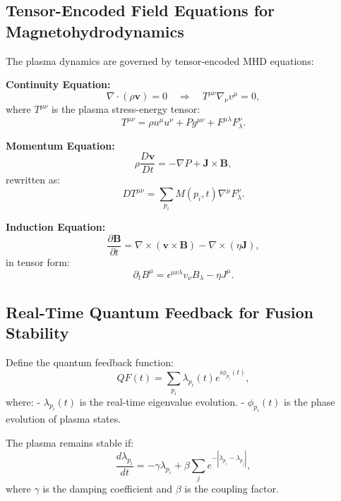 \documentclass{article}
\theoremstyle{plain}
\begin{document}
\subsection{Tensor-Encoded Field Equations for Magnetohydrodynamics}

The plasma dynamics are governed by tensor-encoded MHD equations:

\textbf{Continuity Equation:}
\begin{equation}
    \nabla \cdot (\rho \mathbf{v}) = 0 \quad \Rightarrow \quad T^{\mu\nu} \nabla_\nu v^\mu = 0,
\end{equation}
where $T^{\mu\nu}$ is the plasma stress-energy tensor:
\begin{equation}
    T^{\mu\nu} = \rho u^\mu u^\nu + P g^{\mu\nu} + F^{\mu\lambda} F_{\lambda}^{\nu}.
\end{equation}

\textbf{Momentum Equation:}
\begin{equation}
    \rho \frac{D \mathbf{v}}{Dt} = -\nabla P + \mathbf{J} \times \mathbf{B},
\end{equation}
rewritten as:
\begin{equation}
    D T^{\mu\nu} = \sum_{p_i} M(p_i, t) \nabla^\mu F_{\lambda}^{\nu}.
\end{equation}

\textbf{Induction Equation:}
\begin{equation}
    \frac{\partial \mathbf{B}}{\partial t} = \nabla \times (\mathbf{v} \times \mathbf{B}) - \nabla \times (\eta \mathbf{J}),
\end{equation}
in tensor form:
\begin{equation}
    \partial_t B^\mu = \epsilon^{\mu\nu\lambda} v_\nu B_\lambda - \eta J^\mu.
\end{equation}

\subsection{Real-Time Quantum Feedback for Fusion Stability}

Define the quantum feedback function:
\begin{equation}
    QF(t) = \sum_{p_i} \lambda_{p_i}(t) e^{i\phi_{p_i}(t)},
\end{equation}
where:
- $\lambda_{p_i}(t)$ is the real-time eigenvalue evolution.
- $\phi_{p_i}(t)$ is the phase evolution of plasma states.

The plasma remains stable if:
\begin{equation}
    \frac{d\lambda_{p_i}}{dt} = -\gamma \lambda_{p_i} + \beta \sum_{j} e^{- |\lambda_{p_i} - \lambda_{p_j}|},
\end{equation}
where $\gamma$ is the damping coefficient and $\beta$ is the coupling factor.
\end{document}
